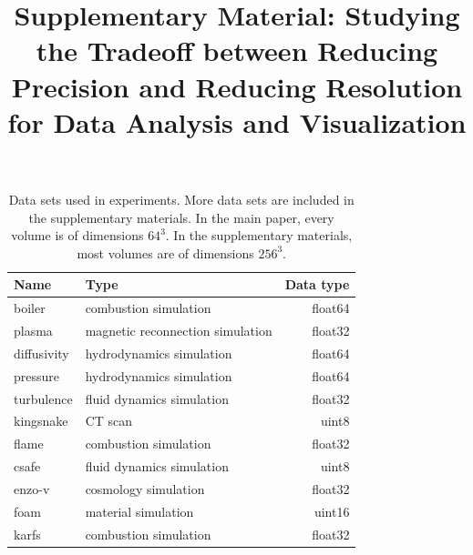 \documentclass{article}
\title{Supplementary Material: Studying the Tradeoff between Reducing Precision and Reducing Resolution for Data Analysis and Visualization}
\date{}
\begin{document}
\maketitle


\begin{table}[ht]
        \caption{Data sets used in experiments. More data sets are included in the
        supplementary materials. In the main paper, every volume is of dimensions $64^3$. In the
        supplementary materials, most volumes are of dimensions $256^3$.}
  \centering
  \begin{tabular}{llr}
  \hline
  Name & Type & Data type \\
  \hline
  boiler & combustion simulation& float64\\
  plasma & magnetic reconnection simulation& float32\\
  diffusivity & hydrodynamics simulation& float64\\
  pressure & hydrodynamics simulation& float64\\
        turbulence & fluid dynamics simulation& float32\\
        kingsnake & CT scan & uint8\\
        flame & combustion simulation& float32\\
        csafe & fluid dynamics simulation& uint8\\
        enzo-v & cosmology simulation& float32\\
        foam & material simulation& uint16\\
        karfs & combustion simulation& float32\\
  \hline
  \end{tabular}\label{tbl:data-sets}
\end{table}
\end{document}
